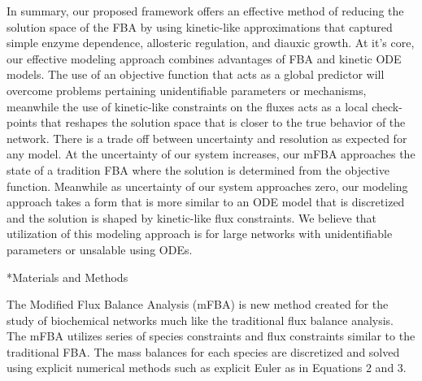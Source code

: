 \documentclass[12pt]{article}
\makeatletter
\renewcommand\section{\@startsection
	{subsection}{2}{0mm}
	{-0.2in}
	{0.05\baselineskip}
	{\normalfont\large\bfseries}}
\makeatother
\begin{document}
In summary, our proposed framework offers an effective method of reducing the solution space of the FBA by using kinetic-like approximations that captured simple enzyme dependence, allosteric regulation, and diauxic growth. At it’s core, our effective modeling approach combines advantages of FBA and kinetic ODE models. The use of an objective function that acts as a global predictor will overcome problems pertaining unidentifiable parameters or mechanisms, meanwhile the use of kinetic-like constraints on the fluxes acts as a local check-points that reshapes the solution space that is closer to the true behavior of the network. There is a trade off between uncertainty and resolution as expected for any model. At the uncertainty of our system increases, our mFBA approaches the state of a tradition FBA where the solution is determined from the objective function. Meanwhile as uncertainty of our system approaches zero, our modeling approach takes a form that is more similar to an ODE model that is discretized and the solution is shaped by kinetic-like flux constraints. We believe that utilization of this modeling approach is for large networks with unidentifiable parameters or unsalable using ODEs.  


\clearpage

\section*{Materials and Methods}

The Modified Flux Balance Analysis (mFBA) is new method created for the study of biochemical networks much like the traditional flux balance analysis. The mFBA utilizes series of species constraints and flux constraints similar to the traditional FBA. The mass balances for each species are discretized and solved using explicit numerical methods such as explicit Euler as in Equations 2 and 3.
\end{document}
